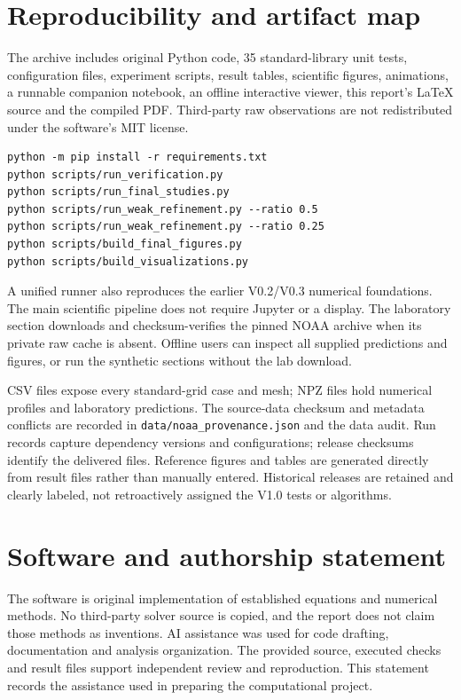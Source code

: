 \documentclass[11pt]{article}
\begin{document}
\section{Reproducibility and artifact map}
The archive includes original Python code, 35 standard-library unit tests,
configuration files, experiment scripts, result tables, scientific figures,
animations, a runnable companion notebook, an offline interactive viewer,
this report's LaTeX source and the compiled PDF. Third-party raw observations
are not redistributed under the software's MIT license.
\begin{verbatim}
python -m pip install -r requirements.txt
python scripts/run_verification.py
python scripts/run_final_studies.py
python scripts/run_weak_refinement.py --ratio 0.5
python scripts/run_weak_refinement.py --ratio 0.25
python scripts/build_final_figures.py
python scripts/build_visualizations.py
\end{verbatim}
A unified runner also reproduces the earlier V0.2/V0.3 numerical foundations.
The main scientific pipeline does not require Jupyter or a display. The
laboratory section downloads and checksum-verifies the pinned NOAA archive
when its private raw cache is absent. Offline users can inspect all supplied
predictions and figures, or run the synthetic sections without the lab download.

CSV files expose every standard-grid case and mesh; NPZ files hold numerical
profiles and laboratory predictions. The source-data checksum and metadata
conflicts are recorded in \texttt{data/noaa\_provenance.json} and the data audit.
Run records capture dependency versions and configurations; release checksums
identify the delivered files. Reference figures and tables are generated directly
from result files rather than manually entered. Historical releases are retained
and clearly labeled, not retroactively assigned the V1.0 tests or algorithms.

\section{Software and authorship statement}
The software is original implementation of established equations and numerical
methods. No third-party solver source is copied, and the report does not claim
those methods as inventions. AI assistance was used for code drafting,
documentation and analysis organization. The provided source, executed checks and result files support independent review
and reproduction. This statement records the assistance used in preparing the
computational project.
\end{document}
